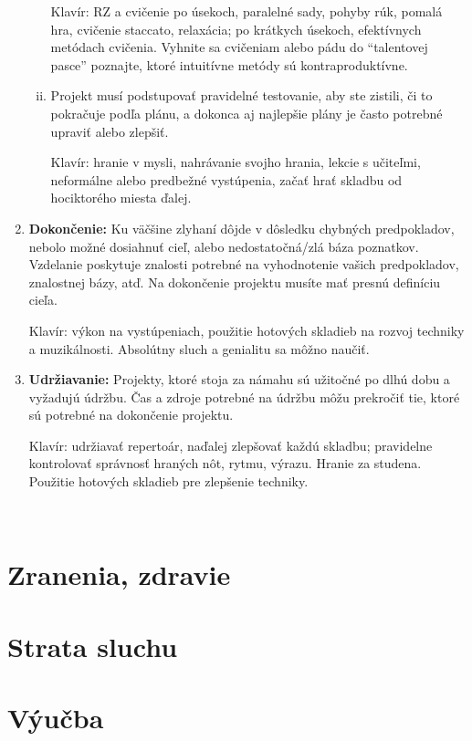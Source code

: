 \documentclass[11pt,a4paper]{book}
\begin{document}
\begin{enumerate}[(1)]
\begin{enumerate}[(i)]
Klavír: RZ a cvičenie po úsekoch, paralelné sady, pohyby rúk, pomalá hra, cvičenie staccato, relaxácia; po krátkych úsekoch, efektívnych metódach cvičenia. Vyhnite sa cvičeniam alebo pádu do “talentovej pasce” poznajte, ktoré intuitívne metódy sú kontraproduktívne.

\item Projekt musí podstupovať pravidelné testovanie, aby ste zistili, či to pokračuje podľa plánu, a dokonca aj najlepšie plány je často potrebné upraviť alebo zlepšiť.

Klavír: hranie v mysli, nahrávanie svojho hrania, lekcie s učiteľmi, neformálne alebo predbežné vystúpenia, začať hrať skladbu od hociktorého miesta ďalej.
\end{enumerate}

\item \textbf{Dokončenie:} Ku väčšine zlyhaní dôjde v dôsledku chybných predpokladov, nebolo možné dosiahnuť cieľ, alebo nedostatočná/zlá báza poznatkov. Vzdelanie poskytuje znalosti potrebné na vyhodnotenie vašich predpokladov, znalostnej bázy, atď. Na dokončenie projektu musíte mať presnú definíciu cieľa.

Klavír: výkon na vystúpeniach, použitie hotových skladieb na rozvoj techniky a muzikálnosti. Absolútny sluch a genialitu sa môžno naučiť.

\item \textbf{Udržiavanie:} Projekty, ktoré stoja za námahu sú užitočné po dlhú dobu a vyžadujú údržbu. Čas a zdroje potrebné na údržbu môžu prekročiť tie, ktoré sú potrebné na dokončenie projektu.

Klavír: udržiavať repertoár, naďalej zlepšovať každú skladbu; pravidelne kontrolovať správnosť hraných nôt, rytmu, výrazu. Hranie za studena. Použitie hotových skladieb pre zlepšenie techniky.
\end{enumerate}

\ 
\section{Zranenia, zdravie}\label{s:injury}

\section{Strata sluchu}\label{s:hearing-loss}

\section{Výučba}\label{s:teaching}
\end{document}
